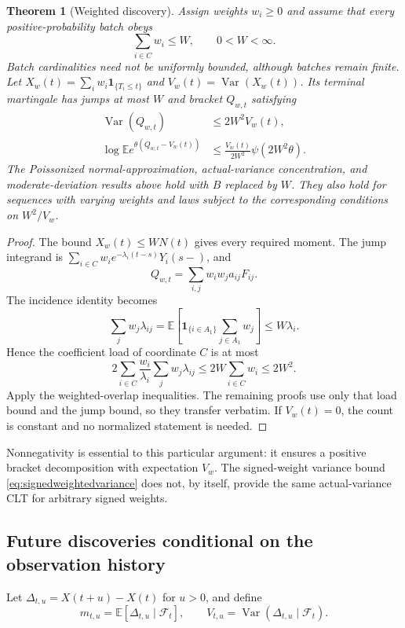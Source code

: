 \documentclass[11pt]{article}
\numberwithin{equation}{section}
\newtheorem{theorem}{Theorem}[section]
\theoremstyle{definition}
\theoremstyle{remark}
\newcommand{\E}{\mathbb E}
\newcommand{\ind}{\mathbf 1}
\newcommand{\Var}{\operatorname{Var}}
\begin{document}
\begin{theorem}[Weighted discovery]\label{thm:weighted}
Assign weights $w_i\ge0$ and assume that every positive-probability batch obeys
\begin{equation}\label{eq:weightedbatch}
 \sum_{i\in C}w_i\le W,\qquad 0<W<\infty.
\end{equation}
Batch cardinalities need not be uniformly bounded, although batches remain
finite. Let
$X_w(t)=\sum_iw_i\ind_{\{T_i\le t\}}$ and
$V_w(t)=\Var(X_w(t))$. Its terminal martingale has jumps at most $W$ and bracket
$Q_{w,t}$ satisfying
\begin{align}
 \Var(Q_{w,t})&\le2W^2V_w(t),\label{eq:weightedQvar}\\
 \log\E e^{\theta(Q_{w,t}-V_w(t))}
 &\le\frac{V_w(t)}{2W^2}\psi(2W^2\theta).
 \label{eq:weightedQmgf}
\end{align}
The Poissonized normal-approximation, actual-variance concentration,
and moderate-deviation results above hold with $B$ replaced by $W$. They also
hold for sequences with varying weights and laws subject to the corresponding
conditions on $W^2/V_w$.
\end{theorem}
\begin{proof}
The bound $X_w(t)\le WN(t)$ gives every required moment. The jump integrand is
$\sum_{i\in C}w_i e^{-\lambda_i(t-s)}Y_i(s-)$, and
\[
 Q_{w,t}=\sum_{i,j}w_iw_j a_{ij}F_{ij}.
\]
The incidence identity becomes
\[
 \sum_jw_j\lambda_{ij}
 =\E\left[\ind_{\{i\in A_1\}}\sum_{j\in A_1}w_j\right]
 \le W\lambda_i.
\]
Hence the coefficient load of coordinate $C$ is at most
\[
 2\sum_{i\in C}\frac{w_i}{\lambda_i}\sum_jw_j\lambda_{ij}
 \le2W\sum_{i\in C}w_i\le2W^2.
\]
Apply the weighted-overlap inequalities. The remaining proofs use only that
load bound and the jump bound, so they transfer verbatim. If $V_w(t)=0$, the
count is constant and no normalized statement is needed.
\end{proof}

Nonnegativity is essential to this particular argument: it ensures a positive
bracket decomposition with expectation $V_w$. The signed-weight variance bound
\eqref{eq:signedweightedvariance} does not, by itself, provide the same
actual-variance CLT for arbitrary signed weights.

\subsection{Future discoveries conditional on the observation history}
Let
$\Delta_{t,u}=X(t+u)-X(t)$ for $u>0$, and define
\[
 m_{t,u}=\E[\Delta_{t,u}\mid\mathcal F_t],\qquad
 V_{t,u}=\Var(\Delta_{t,u}\mid\mathcal F_t).
\]
\end{document}
